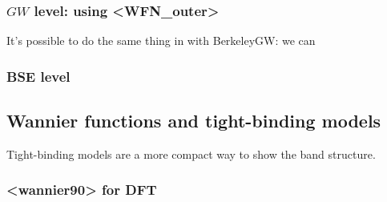 \documentclass[hyperref, a4paper, 12pt]{report}
\def\texttt#1{<#1>}%
\newcommand{\shortcode}[1]{\texttt{#1}}
\begin{document}
\subsubsection{$GW$ level: using \shortcode{WFN_outer}}

It's possible to do the same thing in  
with BerkeleyGW:
we can 

\subsubsection{BSE level}

\subsection{Wannier functions and tight-binding models}

Tight-binding models are a more compact way to show the band structure.

\subsubsection{\shortcode{wannier90} for DFT}
\end{document}
